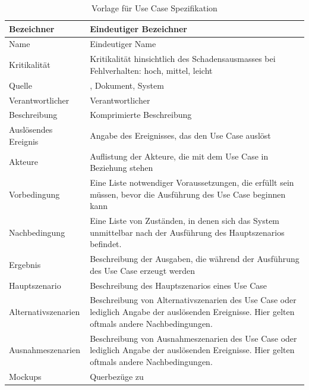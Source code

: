 \begin{table}[ht]
\centering
  \begin{tabular}{ l | p{10cm} }
	\hline
	\rowcolor{gray}
	Bezeichner		&	Eindeutiger Bezeichner\\ \hline
	Name			&	Eindeutiger Name\\ \hline
	Kritikalität		&	Kritikalität hinsichtlich des Schadensausmasses bei Fehlverhalten: hoch, mittel, leicht\\ \hline
	Quelle			&	\glossarmark{Stakeholder}, Dokument, System\\ \hline
	Verantwortlicher	&	Verantwortlicher \glossarmark{Stakeholder}\\ \hline
	Beschreibung	&	Komprimierte Beschreibung\\ \hline
	Auslösendes Ereignis&	Angabe des Ereignisses, das den Use Case auslöst\\ \hline
	Akteure		&	Auflistung der Akteure, die mit dem Use Case in Beziehung stehen\\ \hline
	Vorbedingung	&	Eine Liste notwendiger Voraussetzungen, die erfüllt sein müssen, bevor die Ausführung des Use Case beginnen kann\\ \hline
	Nachbedingung	&	Eine Liste von Zuständen, in denen sich das System unmittelbar nach der Ausführung des Hauptszenarios befindet.\\ \hline
	Ergebnis		&	Beschreibung der Ausgaben, die während der Ausführung des Use Case erzeugt werden\\ \hline
	Hauptszenario	&	Beschreibung des Hauptszenarios eines Use Case\\ \hline
	Alternativszenarien	&	Beschreibung von Alternativszenarien des Use Case oder lediglich Angabe der auslösenden Ereignisse. 
					Hier gelten oftmals andere Nachbedingungen.\\ \hline
	Ausnahmeszenarien&	Beschreibung von Ausnahmeszenarien des Use Case oder lediglich Angabe der auslösenden Ereignisse. 
					Hier gelten oftmals andere Nachbedingungen.\\ \hline
	Mockups	 	&	Querbezüge zu \glossarmark{Mockups}
  \end{tabular}
   \caption{Vorlage für Use Case Spezifikation}\label{table:use_case_template}
\end{table}

